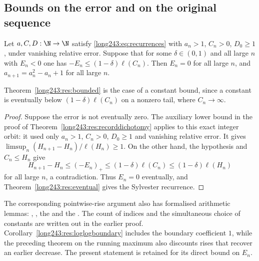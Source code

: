 \subsection{Bounds on the error and on the original sequence}

\begin{theorem}\label{long243:res:slownegative}
Let $a,C,D:\N\to\N$ satisfy \eqref{long243:eq:recurrences} with $a_n>1$, $C_n>0$, $D_0\ge1$, under
vanishing relative error.  Suppose that for some $\delta\in(0,1)$ and all large $n$
with $E_n<0$ one has $-E_n\le(1-\delta)\ell(C_n)$.  Then $E_n=0$ for all large
$n$, and $a_{n+1}=a_n^2-a_n+1$ for all large $n$.
\end{theorem}

\noindent Theorem~\ref{long243:res:bounded} is the case of a constant bound, since a
constant is eventually below $(1-\delta)\ell(C_n)$ on a nonzero tail,
where $C_n\to\infty$.

\begin{proof}
Suppose the error is not eventually zero. The auxiliary lower bound in
the proof of Theorem~\ref{long243:res:recorddichotomy} applies to this
exact integer orbit: it used only $a_n>1$, $C_n>0$, $D_0\ge1$ and
vanishing relative error. It gives
$\limsup_n(H_{n+1}-H_n)/\ell(H_n)\ge1$.
On the other hand, the hypothesis and $C_n\le H_n$ give
\[
 H_{n+1}-H_n\le(-E_n)_+
 \le(1-\delta)\ell(C_n)\le(1-\delta)\ell(H_n)
\]
for all large $n$, a contradiction. Thus $E_n=0$ eventually, and
Theorem~\ref{long243:res:eventual} gives the Sylvester recurrence.
\end{proof}

The corresponding pointwise-rise argument also has formalised arithmetic
lemmas:
,
, the
 and
the
.  The count of indices and the simultaneous choice of constants are
written out in the earlier proof. Corollary~\ref{long243:res:loglogboundary} includes the
boundary coefficient $1$, while the preceding theorem on the running
maximum also discounts rises that recover an earlier decrease. The present
statement is retained for its direct bound on $E_n$.

